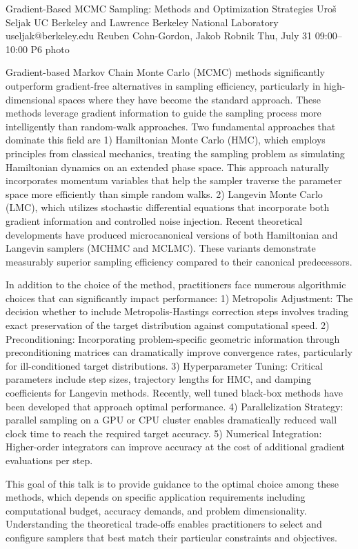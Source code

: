 \clearpage
\begin{talk}
  {Gradient-Based MCMC Sampling: Methods and Optimization Strategies}%
  {Uro\v s Seljak}%
  {UC Berkeley and Lawrence Berkeley National Laboratory}%
  {useljak@berkeley.edu}%
  {Reuben Cohn-Gordon, Jakob Robnik}%
  {}%
  {Thu, July 31 09:00–10:00}%
  {P6}%
  {photo}%
  
				
			
\vspace{-5ex}
Gradient-based Markov Chain Monte Carlo (MCMC) methods significantly outperform gradient-free alternatives in sampling efficiency, particularly in high-dimensional spaces where they have become the standard approach. These methods leverage gradient information to guide the sampling process more intelligently than random-walk approaches.
Two fundamental approaches that dominate this field are 1)
Hamiltonian Monte Carlo (HMC), which  employs principles from classical mechanics, treating the sampling problem as simulating Hamiltonian dynamics on an extended phase space. This approach naturally incorporates momentum variables that help the sampler traverse the parameter space more efficiently than simple random walks. 2)
Langevin Monte Carlo (LMC), which utilizes stochastic differential equations that incorporate both gradient information and controlled noise injection. 
Recent theoretical developments have produced microcanonical versions of both Hamiltonian and Langevin samplers (MCHMC and MCLMC). These variants demonstrate measurably superior sampling efficiency compared to their canonical predecessors.

In addition to the choice of 
the method, 
practitioners face numerous algorithmic choices that can significantly impact performance:
1) Metropolis Adjustment: The decision whether to include Metropolis-Hastings correction steps involves trading exact preservation of the target distribution against computational speed.
2) Preconditioning: Incorporating problem-specific geometric information through preconditioning matrices can dramatically improve convergence rates, particularly for ill-conditioned target distributions.
3) Hyperparameter Tuning: Critical parameters include step sizes, trajectory lengths for HMC, and damping coefficients for Langevin methods. Recently, well tuned black-box methods have been developed that approach optimal performance. 
4) Parallelization Strategy: parallel sampling on a GPU or CPU cluster enables dramatically reduced wall clock time to reach the required target accuracy. 
5) Numerical Integration: Higher-order integrators can improve accuracy at the cost of additional gradient evaluations per step.

This goal of this talk is to provide
guidance to 
the optimal choice among these methods, which depends on specific application requirements including computational budget, accuracy demands, and problem dimensionality. Understanding the theoretical trade-offs enables practitioners to select and configure samplers that best match their particular constraints and objectives.


\end{talk}

